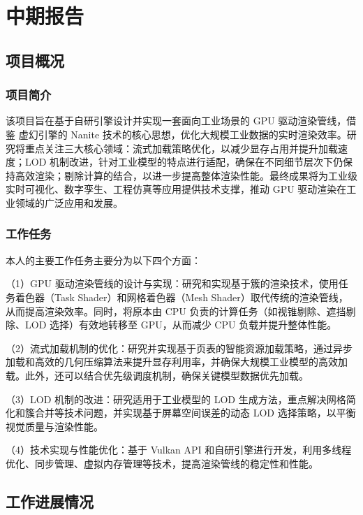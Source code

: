 \cleardoublepage
\chapter{中期报告}

\section{项目概况}

\subsection{项目简介}

该项目旨在基于自研引擎设计并实现一套面向工业场景的 GPU 驱动渲染管线，借鉴 虚幻引擎的 Nanite 技术的核心思想，优化大规模工业数据的实时渲染效率。研究将重点关注三大核心领域：流式加载策略优化，以减少显存占用并提升加载速度；LOD 机制改进，针对工业模型的特点进行适配，确保在不同细节层次下仍保持高效渲染；剔除计算的结合，以进一步提高整体渲染性能。最终成果将为工业级实时可视化、数字孪生、工程仿真等应用提供技术支撑，推动 GPU 驱动渲染在工业领域的广泛应用和发展。

\subsection{工作任务}

本人的主要工作任务主要分为以下四个方面：

（1）GPU 驱动渲染管线的设计与实现：研究和实现基于簇的渲染技术，使用任务着色器（Task Shader）和网格着色器（Mesh Shader）取代传统的渲染管线，从而提高渲染效率。同时，将原本由 CPU 负责的计算任务（如视锥剔除、遮挡剔除、LOD 选择）有效地转移至 GPU，从而减少 CPU 负载并提升整体性能。

（2）流式加载机制的优化：研究并实现基于页表的智能资源加载策略，通过异步加载和高效的几何压缩算法来提升显存利用率，并确保大规模工业模型的高效加载。此外，还可以结合优先级调度机制，确保关键模型数据优先加载。

（3）LOD 机制的改进：研究适用于工业模型的 LOD 生成方法，重点解决网格简化和簇合并等技术问题，并实现基于屏幕空间误差的动态 LOD 选择策略，以平衡视觉质量与渲染性能。

（4）技术实现与性能优化：基于 Vulkan API 和自研引擎进行开发，利用多线程优化、同步管理、虚拟内存管理等技术，提高渲染管线的稳定性和性能。

\section{工作进展情况}

